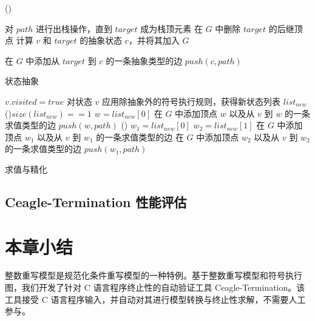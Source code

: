 \begin{algorithm}[htbp]
   \Else() { 
    对 $path$ 进行出栈操作，直到 $target$ 成为栈顶元素\;
    在 $G$ 中删除 $target$ 的后继顶点\;
    计算 $v$ 和 $target$ 的抽象状态 $c$，并将其加入 $G$\;

     {
      在 $G$ 中添加从 $target$ 到 $c$ 的一条抽象类型的边\;
      $push(c,path)$\;
    } 
  }
\caption{状态抽象}
\label{alg:abstraction}
\end{algorithm}

\begin{algorithm}[htbp]
  $v.visited = true$\;
  对状态 $v$ 应用除抽象外的符号执行规则，获得新状态列表 $list_{new}$\;
  \uIf(){$size(list_{new}) == 1$ } {
    $w = list_{new}[0]$\;
    在 $G$ 中添加顶点 $w$ 以及从 $v$ 到 $w$ 的一条求值类型的边\;
    $push(w,path)$\;
  } \Else() {
    $w_1 = list_{new}[0]$\;
    $w_2 = list_{new}[1]$\;
    在 $G$ 中添加顶点 $w_1$ 以及从 $v$ 到 $w_1$ 的一条求值类型的边\;
    在 $G$ 中添加顶点 $w_2$ 以及从 $v$ 到 $w_2$ 的一条求值类型的边\;
    $push(w_1,path)$\;
  }
\caption{求值与精化}
\label{alg:evaluation}
\end{algorithm}


\subsection{Ceagle-Termination 性能评估}


\section{本章小结}

整数重写模型是规范化条件重写模型的一种特例。基于整数重写模型和符号执行图，我们开发了针对 C 语言程序终止性的自动验证工具 Ceagle-Termination。该工具接受 C 语言程序输入，并自动对其进行模型转换与终止性求解，不需要人工参与。

